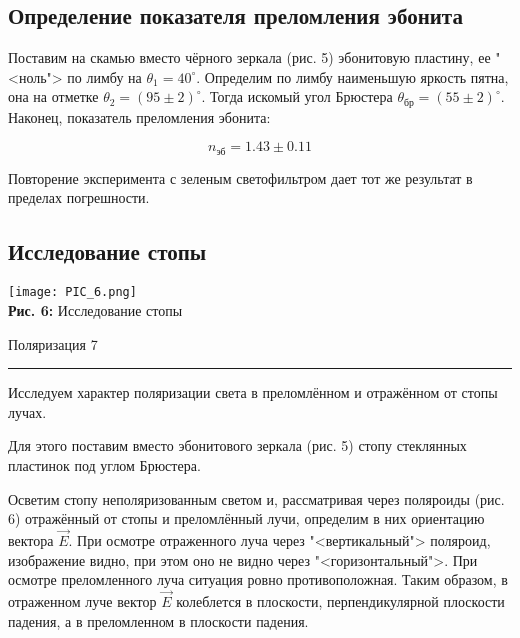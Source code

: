 \documentclass[12pt,a4paper]{scrartcl}
\begin{document}
	\subsection{Определение показателя преломления эбонита}
	
	Поставим на скамью вместо чёрного зеркала (рис. 5) эбонитовую пластину, ее "<ноль"> по лимбу на $\theta_1 = 40^\circ$. Определим по лимбу наименьшую яркость пятна, она на отметке $\theta_2 = (95 \pm 2)^\circ$. Тогда искомый угол Брюстера $\theta_{\text{бр}} = (55 \pm 2)^\circ$. Наконец, показатель преломления эбонита:
	
	$$n_{\text{эб}} = 1.43 \pm 0.11$$
	
	Повторение эксперимента с зеленым светофильтром дает тот же результат в пределах погрешности.
	
	\subsection{Исследование стопы}
	
	\begin{center}
		\texttt{[image: PIC\_6.png]}
		\\\textbf{Рис. 6:} Исследование стопы
	\end{center}
	
	\newpage
	
	
	\begin{flushleft}
		\footnotesize{Поляризация} \hspace{\fill} \footnotesize{7}
		\\[-0.3cm]\noindent\rule{\textwidth}{0.3pt}
	\end{flushleft}
	
	Исследуем характер поляризации света в преломлённом и отражённом от стопы лучах. 
	
	Для этого поставим вместо эбонитового зеркала (рис. 5) стопу стеклянных пластинок под углом Брюстера.
	
	Осветим стопу неполяризованным светом и, рассматривая через поляроиды (рис. 6) отражённый от стопы и преломлённый лучи, определим в них ориентацию вектора $ \vec{E} $. При осмотре отраженного луча через "<вертикальный"> поляроид, изображение видно, при этом оно не видно через "<горизонтальный">. При осмотре преломленного луча ситуация ровно противоположная. Таким образом, в отраженном луче вектор $\vec{E}$ колеблется в плоскости, перпендикулярной плоскости падения, а в преломленном в плоскости падения.
 	
\end{document}

